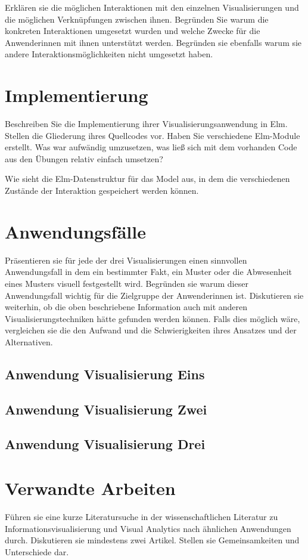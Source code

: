 \documentclass[usegeometry=true]{scrartcl}
\begin{document}
Erklären sie die möglichen Interaktionen mit den einzelnen Visualisierungen und die möglichen Verknüpfungen zwischen ihnen. Begründen Sie warum die konkreten Interaktionen umgesetzt wurden und welche Zwecke für die Anwenderinnen mit ihnen unterstützt werden. Begründen sie ebenfalls warum sie andere Interaktionsmöglichkeiten nicht umgesetzt haben. 

\section{Implementierung}
Beschreiben Sie die Implementierung ihrer Visualisierungsanwendung in Elm. Stellen die Gliederung ihres Quellcodes vor. Haben Sie verschiedene Elm-Module erstellt. Was war aufwändig umzusetzen, was ließ sich mit dem vorhanden Code aus den Übungen relativ einfach umsetzen? 

Wie sieht die Elm-Datenstruktur für das Model aus, in dem die verschiedenen Zustände der Interaktion gespeichert werden können.

\section{Anwendungsfälle}
Präsentieren sie für jede der drei Visualisierungen einen sinnvollen Anwendungsfall in dem ein bestimmter Fakt, ein Muster oder die Abwesenheit eines Musters visuell festgestellt wird. Begründen sie warum dieser Anwendungsfall wichtig für die Zielgruppe der Anwenderinnen ist. Diskutieren sie weiterhin, ob die oben beschriebene Information auch mit anderen Visualisierungstechniken hätte gefunden werden können. Falls dies möglich wäre, vergleichen sie die den Aufwand und die Schwierigkeiten ihres Ansatzes und der Alternativen. 
\subsection{Anwendung Visualisierung Eins}
\subsection{Anwendung Visualisierung Zwei}
\subsection{Anwendung Visualisierung Drei}

\section{Verwandte Arbeiten}
Führen sie eine kurze Literatursuche in der wissenschaftlichen Literatur zu Informationsvisualisierung und Visual Analytics nach ähnlichen Anwendungen durch. Diskutieren sie mindestens zwei Artikel. Stellen sie Gemeinsamkeiten und Unterschiede dar.
\end{document}
